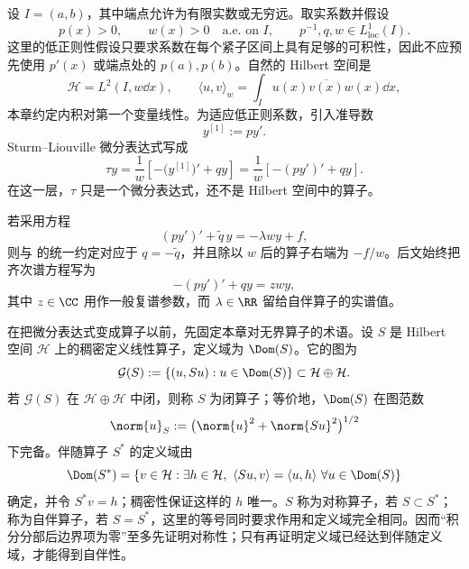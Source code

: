 \begin{definition}
设 $I=(a,b)$，其中端点允许为有限实数或无穷远。取实系数并假设
\begin{equation}\label{eq:math-sl-coefficients}
 p(x)>0,\qquad w(x)>0\quad\text{a.e. on }I,
 \qquad p^{-1},q,w\in L^1_{\mathrm{loc}}(I).
\end{equation}
这里的低正则性假设只要求系数在每个紧子区间上具有足够的可积性，因此不应预先使用 $p'(x)$ 或端点处的 $p(a),p(b)$。自然的 Hilbert 空间是
\begin{equation*}\mathcal H=L^2(I,w\dd x),\qquad
 \langle u,v\rangle_w=\int_I u(x)\overline{v(x)}w(x)\dd x,
\end{equation*}
本章约定内积对第一个变量线性。为适应低正则系数，引入准导数
\[
 y^{[1]}:=p y'.
\]
Sturm--Liouville 微分表达式写成
\begin{equation}\label{eq:math-sl-tau-general}
 \tau y=\frac{1}{w}\left[-\bigl(y^{[1]}\bigr)'+qy\right]
 =\frac{1}{w}\left[-(py')'+qy\right].
\end{equation}
在这一层，$\tau$ 只是一个微分表达式，还不是 Hilbert 空间中的算子。
\end{definition}

若采用方程
\[
 (py')'+\widetilde q\,y=-\lambda wy+f,
\]
则与 的统一约定对应于 $q=-\widetilde q$，并且除以 $w$ 后的算子右端为 $-f/w$。后文始终把齐次谱方程写为
\begin{equation*}-(py')'+qy=zwy,
\end{equation*}
其中 $z\in\CC$ 用作一般复谱参数，而 $\lambda\in\RR$ 留给自伴算子的实谱值。
\begin{definition}[闭性、伴随与自伴性]
在把微分表达式变成算子以前，先固定本章对无界算子的术语。设 $S$ 是 Hilbert 空间 $\mathcal H$ 上的稠密定义线性算子，定义域为 $\Dom(S)$。它的图为
\[
 \mathcal G(S):=\{(u,Su):u\in\Dom(S)\}\subset\mathcal H\oplus\mathcal H.
\]
若 $\mathcal G(S)$ 在 $\mathcal H\oplus\mathcal H$ 中闭，则称 $S$ 为闭算子；等价地，$\Dom(S)$ 在图范数
\[
 \norm{u}_S:=\bigl(\norm{u}^2+\norm{Su}^2\bigr)^{1/2}
\]
下完备。伴随算子 $S^*$ 的定义域由
\[
 \Dom(S^*)=\left\{v\in\mathcal H:\exists h\in\mathcal H,\ 
 \langle Su,v\rangle=\langle u,h\rangle\ 
 \forall u\in\Dom(S)\right\}
\]
确定，并令 $S^*v=h$；稠密性保证这样的 $h$ 唯一。$S$ 称为对称算子，若 $S\subset S^*$；称为自伴算子，若 $S=S^*$，这里的等号同时要求作用和定义域完全相同。因而“积分分部后边界项为零”至多先证明对称性；只有再证明定义域已经达到伴随定义域，才能得到自伴性。
\end{definition}

